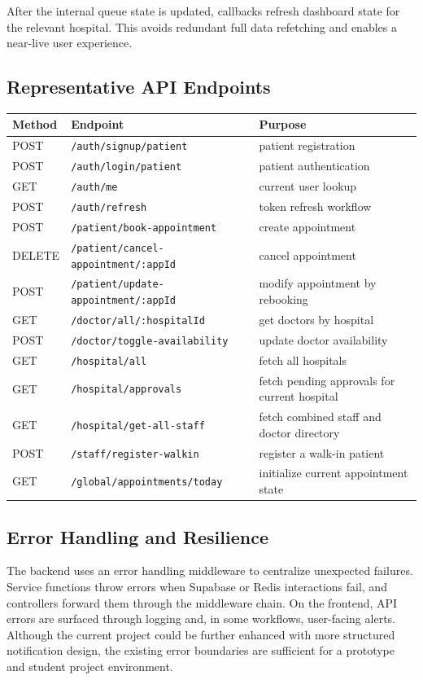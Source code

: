 \documentclass[12pt,onecolumn]{IEEEtran}
\begin{document}
After the internal queue state is updated, callbacks refresh dashboard state for the relevant hospital. This avoids redundant full data refetching and enables a near-live user experience.

\subsection{Representative API Endpoints}
\begin{tabularx}{\textwidth}{l l X}
\toprule
\textbf{Method} & \textbf{Endpoint} & \textbf{Purpose} \\
\midrule
POST & \texttt{/auth/signup/patient} & patient registration \\
POST & \texttt{/auth/login/patient} & patient authentication \\
GET & \texttt{/auth/me} & current user lookup \\
POST & \texttt{/auth/refresh} & token refresh workflow \\
POST & \texttt{/patient/book-appointment} & create appointment \\
DELETE & \texttt{/patient/cancel-appointment/:appId} & cancel appointment \\
POST & \texttt{/patient/update-appointment/:appId} & modify appointment by rebooking \\
GET & \texttt{/doctor/all/:hospitalId} & get doctors by hospital \\
POST & \texttt{/doctor/toggle-availability} & update doctor availability \\
GET & \texttt{/hospital/all} & fetch all hospitals \\
GET & \texttt{/hospital/approvals} & fetch pending approvals for current hospital \\
GET & \texttt{/hospital/get-all-staff} & fetch combined staff and doctor directory \\
POST & \texttt{/staff/register-walkin} & register a walk-in patient \\
GET & \texttt{/global/appointments/today} & initialize current appointment state \\
\bottomrule
\end{tabularx}

\subsection{Error Handling and Resilience}
The backend uses an error handling middleware to centralize unexpected failures. Service functions throw errors when Supabase or Redis interactions fail, and controllers forward them through the middleware chain. On the frontend, API errors are surfaced through logging and, in some workflows, user-facing alerts. Although the current project could be further enhanced with more structured notification design, the existing error boundaries are sufficient for a prototype and student project environment.
\end{document}

